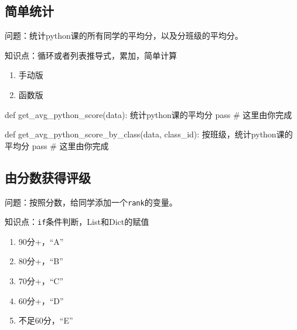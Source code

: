\documentclass[
  letterpaper,
  DIV=11,
  numbers=noendperiod]{scrreprt}
\newenvironment{Shaded}{\begin{snugshade}}{\end{snugshade}}
\newcommand{\CommentTok}[1]{\textcolor[rgb]{0.37,0.37,0.37}{#1}}
\newcommand{\ControlFlowTok}[1]{\textcolor[rgb]{0.00,0.23,0.31}{#1}}
\newcommand{\KeywordTok}[1]{\textcolor[rgb]{0.00,0.23,0.31}{#1}}
\newcommand{\NormalTok}[1]{\textcolor[rgb]{0.00,0.23,0.31}{#1}}
\providecommand{\tightlist}{%
  \setlength{\itemsep}{0pt}\setlength{\parskip}{0pt}}\usepackage{longtable,booktabs,array}
\begin{document}
\hypertarget{ux7b80ux5355ux7edfux8ba1-1}{%
\subsection{简单统计}\label{ux7b80ux5355ux7edfux8ba1-1}}

问题：统计python课的所有同学的平均分，以及分班级的平均分。

知识点：循环或者列表推导式，累加，简单计算

\begin{enumerate}
\def\labelenumi{\arabic{enumi}.}
\tightlist
\item
  手动版
\item
  函数版
\end{enumerate}

\begin{Shaded}
\begin{Highlighting}[]
\KeywordTok{def}\NormalTok{ get\_avg\_python\_score(data):}
  \CommentTok{\textquotesingle{}\textquotesingle{}\textquotesingle{}}
\CommentTok{  统计python课的平均分}
\CommentTok{  \textquotesingle{}\textquotesingle{}\textquotesingle{}}
  \ControlFlowTok{pass} \CommentTok{\# 这里由你完成}

\KeywordTok{def}\NormalTok{ get\_avg\_python\_score\_by\_class(data,  class\_id):}
  \CommentTok{\textquotesingle{}\textquotesingle{}\textquotesingle{}}
\CommentTok{  按班级，统计python课的平均分}
\CommentTok{  \textquotesingle{}\textquotesingle{}\textquotesingle{}}
  \ControlFlowTok{pass} \CommentTok{\# 这里由你完成}
\end{Highlighting}
\end{Shaded}

\hypertarget{ux7531ux5206ux6570ux83b7ux5f97ux8bc4ux7ea7}{%
\subsection{由分数获得评级}\label{ux7531ux5206ux6570ux83b7ux5f97ux8bc4ux7ea7}}

问题：按照分数，给同学添加一个\texttt{rank}的变量。

知识点：\texttt{if}条件判断，List和Dict的赋值

\begin{enumerate}
\def\labelenumi{\arabic{enumi}.}
\tightlist
\item
  90分+，``A''
\item
  80分+，``B''
\item
  70分+，``C''
\item
  60分+，``D''
\item
  不足60分，``E''
\end{enumerate}
\end{document}

